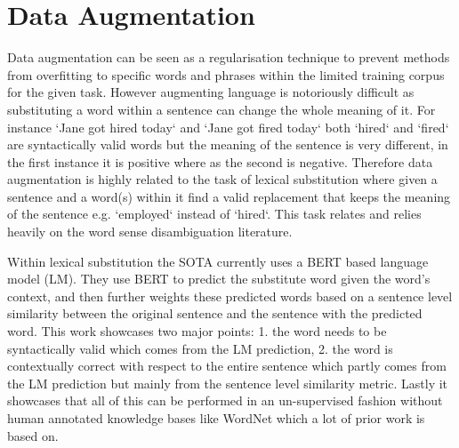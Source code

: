 

\section{Data Augmentation}
Data augmentation can be seen as a regularisation technique to prevent methods from overfitting to specific words and phrases within the limited training corpus for the given task. However augmenting language is notoriously difficult as substituting a word within a sentence can change the whole meaning of it. For instance `Jane got hired today` and `Jane got fired today` both `hired` and `fired` are syntactically valid words but the meaning of the sentence is very different, in the first instance it is positive where as the second is negative. Therefore data augmentation is highly related to the task of lexical substitution \cite{aug_mccarthy-navigli-2007-semeval} where given a sentence and a word(s) within it find a valid replacement that keeps the meaning of the sentence e.g. `employed` instead of `hired`. This task relates and relies heavily on the word sense disambiguation literature.

Within lexical substitution the SOTA currently \cite{aug_zhou-etal-2019-bert} uses a BERT \cite{aug_devlin-etal-2019-bert} based language model (LM). They use BERT to predict the substitute word given the word's context, and then further weights these predicted words based on a sentence level similarity between the original sentence and the sentence with the predicted word. This work showcases two major points: 1. the word needs to be syntactically valid which comes from the LM prediction, 2. the word is contextually correct with respect to the entire sentence which partly comes from the LM prediction but mainly from the sentence level similarity metric. Lastly it showcases that all of this can be performed in an un-supervised fashion without human annotated knowledge bases like WordNet which a lot of prior work is based on.

